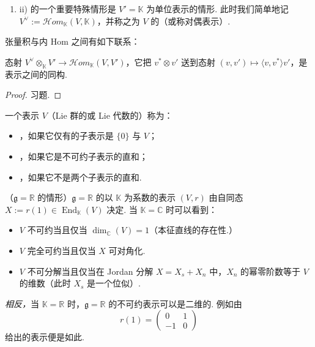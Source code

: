 \begin{numpara}
\begin{enumerate}[label=\roman*)]
\item ii) 的一个重要特殊情形是 $V'=\mathbb K$ 为单位表示的情形. 此时我们简单地记 $V^{\vee}:=\mathcal{H}om_{\mathbb K}(V,\mathbb K)$，并称之为 $V$ 的（或称对偶表示）.
\end{enumerate}
张量积与内 Hom 之间有如下联系：
\begin{lemma*}
态射 $V^{\vee}\otimes_{\mathbb K}V'\longrightarrow\mathcal{H}om_{\mathbb K}(V,V')$，它把 $v^{*}\otimes v'$ 送到态射 $(v,v')\mapsto\langle v,v^{*}\rangle v'$，是表示之间的同构.
\end{lemma*}
\begin{proof}
习题.
\end{proof}
\end{numpara}

\begin{numpara}[表示的约化]\label{np:lie-1-12-6}
一个表示 $V$（Lie 群的或 Lie 代数的）称为：
\begin{itemize}[label=--]
\item {}，如果它仅有的子表示是 $\{0\}$ 与 $V$；
\item {}，如果它是不可约子表示的直和；
\item {}，如果它不是两个子表示的直和.
\end{itemize}
\begin{example*}
（$\mathfrak g=\mathbb R$ 的情形）$\mathfrak g=\mathbb R$ 的以 $\mathbb K$ 为系数的表示 $(V,r)$ 由自同态 $X:=r(1)\in\operatorname{End}_{\mathbb K}(V)$ 决定. 当 $\mathbb K=\mathbb C$ 时可以看到：
\begin{itemize}[label=--]
\item $V$ 不可约当且仅当 $\dim_{\mathbb C}(V)=1$（本征直线的存在性.）
\item $V$ 完全可约当且仅当 $X$ 可对角化.
\item $V$ 不可分解当且仅当在 Jordan 分解 $X=X_{s}+X_{n}$ 中，$X_{n}$ 的幂零阶数等于 $V$ 的维数（此时 $X_{s}$ 是一个位似）.
\end{itemize}
\emph{相反，}当 $\mathbb K=\mathbb R$ 时，$\mathfrak g=\mathbb R$ 的不可约表示可以是二维的. 例如由
\[
r(1)=\begin{pmatrix}0&1\\-1&0\end{pmatrix}
\]
给出的表示便是如此.
\end{example*}

\end{numpara}
